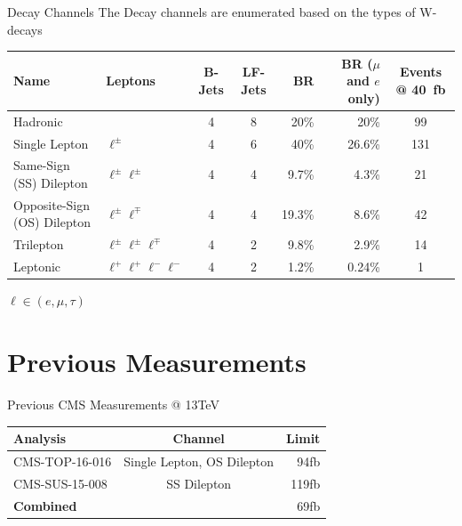 \documentclass[english,aspectratio=169]{beamer}
\newcommand{\fb}{\si{\femto\barn}}
\newcommand{\invfb}{\si{\per\femto\barn}}
\begin{document}
\begin{frame}{Decay Channels}
  The Decay channels are enumerated based on the types of W-decays
\begin{table}[]
  \tiny
  \begin{tabular}{@{}llccrrc@{}}
    \textbf{Name}               & \textbf{Leptons}           & \textbf{B-Jets} & \textbf{LF-Jets} & \textbf{BR}     & \textbf{BR ($\mu$ and $e$ only)} & \textbf{Events @ 40\invfb}    \\ \midrule
  Hadronic                    &                            & 4               & 8                & 20\%            & 20\%                             & 99                               \\ \midrule
  Single Lepton               & $\ell^\pm$                 & 4               & 6                & 40\%            & 26.6\%                           & 131                              \\ \midrule
  Same-Sign (SS) Dilepton     & $\ell^\pm \ell^\pm$        & 4               & 4                & 9.7\%           & 4.3\%                            & 21                               \\ \midrule
  Opposite-Sign (OS) Dilepton & $\ell^\pm \ell^\mp$        & 4               & 4                & 19.3\%          & 8.6\%                            & 42                               \\ \midrule
  Trilepton                   & $\ell^\pm\ell^\pm\ell^\mp$ & 4               & 2                & 9.8\%           & 2.9\%                            & 14                               \\ \midrule
  Leptonic                    & $\ell^+\ell^+\ell^-\ell^-$ & 4               & 2                & 1.2\%           & 0.24\%                           & 1                                \\ \bottomrule
  \end{tabular}
\end{table}
\vfill
\footnotesize{$\ell \in \left(e,\mu,\tau\right)$}
\end{frame}

\section{Previous Measurements}
\begin{frame}{Previous CMS Measurements @ 13TeV}
\begin{table}[]
  \begin{tabular}{@{}lcr@{}}
  \textbf{Analysis}           & \textbf{Channel}            & \textbf{Limit}  \\ \midrule
  CMS-TOP-16-016              & Single Lepton, OS Dilepton  & 94\fb          \\ \midrule
  CMS-SUS-15-008              & SS Dilepton                 & 119\fb         \\ \bottomrule
  \textbf{Combined}           &                             & 69\fb          \\
  \end{tabular}
\end{table}
\end{frame}
\end{document}
